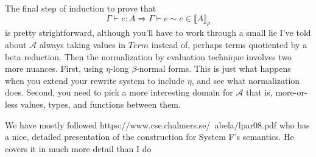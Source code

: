 \documentclass[12pt]{article}
\begin{document}
The final step of induction to prove that 
\[
  \Gamma \vdash e : A \Rightarrow \Gamma \vdash e \sim e \in \llbracket A\rrbracket_\rho
\]
is pretty strightforward, although you'll have to work through a small lie I've told about $\mathcal{A}$ always taking values in $Term$ instead of, perhaps terms quotiented by a beta reduction.
Then the normalization by evaluation technique involves two more nuances.
First, using $\eta$-long $\beta$-normal forms.
This is just what happens when you extend your rewrite system to include $\eta$, and see what normalization does.
Second, you need to pick a more interesting domain for $\mathcal{A}$ that is, more-or-less values, types, and functions between them. 

We have mostly followed https://www.cse.chalmers.se/~abela/lpar08.pdf who has a nice, detailed presentation of the construction for System F's semantics.
He covers it in much more detail than I do
\end{document}
